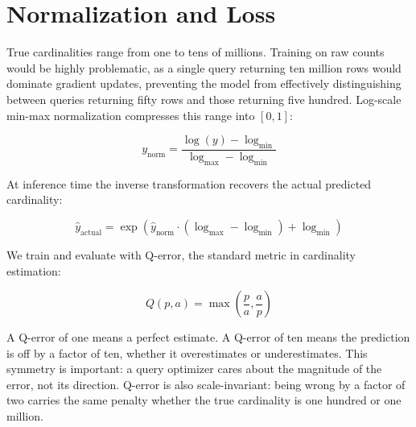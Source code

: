 \section{Normalization and Loss}

True cardinalities range from one to tens of millions. Training on raw counts would be highly problematic, as a single query returning ten million rows would dominate gradient updates, preventing the model from effectively distinguishing between queries returning fifty rows and those returning five hundred. Log-scale min-max normalization compresses this range into $[0, 1]$:

\begin{equation}
y_{\text{norm}} = \frac{\log(y) - \log_{\min}}{\log_{\max} - \log_{\min}}
\end{equation}

At inference time the inverse transformation recovers the actual predicted cardinality:

\begin{equation}
\hat{y}_{\text{actual}} = \exp\left(\hat{y}_{\text{norm}} \cdot (\log_{\max} - \log_{\min}) + \log_{\min}\right)
\end{equation}

We train and evaluate with Q-error, the standard metric in cardinality estimation:

\begin{equation}
Q(p, a) = \max\left(\frac{p}{a}, \frac{a}{p}\right)
\end{equation}

A Q-error of one means a perfect estimate. A Q-error of ten means the prediction is off by a factor of ten, whether it overestimates or underestimates. This symmetry is important: a query optimizer cares about the magnitude of the error, not its direction. Q-error is also scale-invariant: being wrong by a factor of two carries the same penalty whether the true cardinality is one hundred or one million.